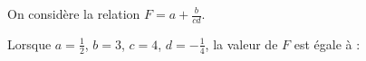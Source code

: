 
On considère la relation $F = a + \frac{b}{c d}$.

\smallskip

Lorsque $a = \frac{1}{2}$, $b = 3$, $c = 4$, $d = -\frac{1}{4}$, la valeur de $F$ est égale à :

\smallskip

